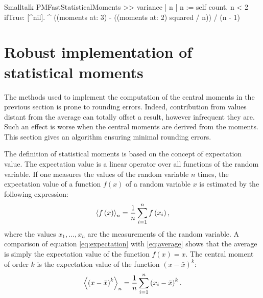 \begin{displaycode}{Smalltalk}
PMFastStatisticalMoments >> variance
    | n |
    n := self count.
    n < 2 ifTrue: [^nil].
    ^ ((moments at: 3) - ((moments at: 2) squared / n)) / (n - 1)
\end{displaycode}

\section{Robust implementation of statistical moments}
\label{sec:robustmoment} The methods used to implement the computation of the central moments in the previous section is prone to rounding errors. Indeed, contribution from values distant from the average can totally offset a result, however infrequent they are.
Such an effect is worse when the central moments are derived from the moments. This section gives an algorithm ensuring minimal rounding errors.

The definition of statistical moments is based on the concept of expectation value.
The expectation value is a linear operator over all functions of the random variable. If one measures the values of the random variable $n$ times, the expectation value of a function $f\left(x\right)$ of a random variable $x$ is estimated by the following expression:
\begin{equation}
\label{eq:expectation}
 \left\langle f\left(x\right)\right\rangle_n
= {1\over n}\sum_{i=1}^n f\left(x_i\right),
\end{equation}
where the values $x_1,\ldots,x_n$ are the measurements of the
random variable. A comparison of equation \ref{eq:expectation}
with \ref{eq:average} shows that the average is simply the
expectation value of the function $f\left(x\right)=x$. The central
moment of order $k$ is the expectation value of the function
$\left(x-\bar{x}\right)^k$:
\begin{equation}
\label{eq:expectmoment}
 \left\langle \left(x-\bar{x}\right)^k\right\rangle_n
= {1\over n}\sum_{i=1}^n \left(x_i-\bar{x}\right)^k.
\end{equation}

